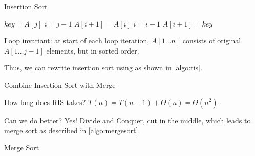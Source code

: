 \begin{algorithm}[H]
    \caption{Insertion Sort}\label{algo:insertion}
    \begin{algorithmic}[1]
                \State $key = A[j]$
                \State $i = j - 1$
                    \State $A[i+1] = A[i]$
                    \State $i = i - 1$
                \EndWhile
                \State $A[i+1] = key$
            \EndFor
        \EndProcedure
    \end{algorithmic}
\end{algorithm}

Loop invariant: at start of each loop iteration,
$A[1 \ldots n]$ consists of original $A[1 \ldots j-1]$ elements,
but in sorted order.

Thus, we can rewrite insertion sort using 
as shown in \cref{algo:ris}.

\begin{algorithm}[H]
    \caption{Combine Insertion Sort with Merge}\label{algo:ris}
    \begin{algorithmic}[1]
                \State{}
            \EndFor
        \EndProcedure
         
                \State{}
                \State{}
            \EndIf
        \EndProcedure
    \end{algorithmic}
\end{algorithm}

How long does RIS takes?
$T(n) = T(n-1) + \Theta(n) = \Theta(n^2)$.

Can we do better? Yes! Divide and Conquer, cut in the middle,
which leads to merge sort as described in \cref{algo:mergesort}.

\begin{algorithm}[H]
    \caption{Merge Sort}\label{algo:mergesort}
    \begin{algorithmic}[1]
                \State{}
                \State{}
                \State{}
            \EndIf
        \EndProcedure
    \end{algorithmic}
\end{algorithm}


